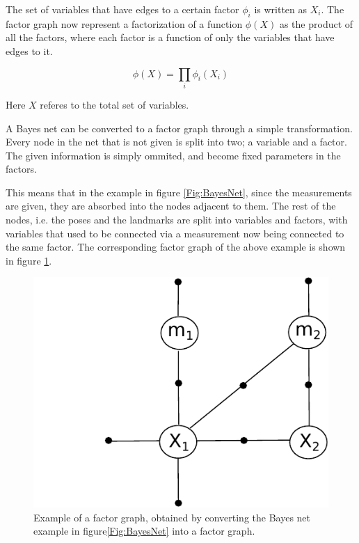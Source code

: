The set of variables that have edges to a certain factor $\phi_i$ is written as $X_i$. The factor graph now represent a factorization of a function $\phi(X)$ as the product of all the factors, where each factor is a function of only the variables that have edges to it.

\begin{equation}
    \phi(X) = \prod_i \phi_i(X_i)
\end{equation}

Here $X$ referes to the total set of variables. 

A Bayes net can be converted to a factor graph through a simple transformation. Every node in the net that is not given is split into two; a variable and a factor. The given information is simply ommited, and become fixed parameters in the factors. 

This means that in the example in figure \ref{Fig:BayesNet}, since the measurements are given, they are absorbed into the nodes adjacent to them. The rest of the nodes, i.e. the poses and the landmarks are split into variables and factors, with variables that used to be connected via a measurement now being connected to the same factor. The corresponding factor graph of the above example is shown in figure \ref{Fig:FactorGraph}.

\begin{figure}
    \centering
    \includegraphics[width=0.8\linewidth]{0_Images/3_Background/FactorGraph.pdf}
    \caption[Example of a Bayes net.]
    {Example of a factor graph, obtained by converting the Bayes net example in figure\ref{Fig:BayesNet} into a factor graph.}
    \label{Fig:FactorGraph}
\end{figure}